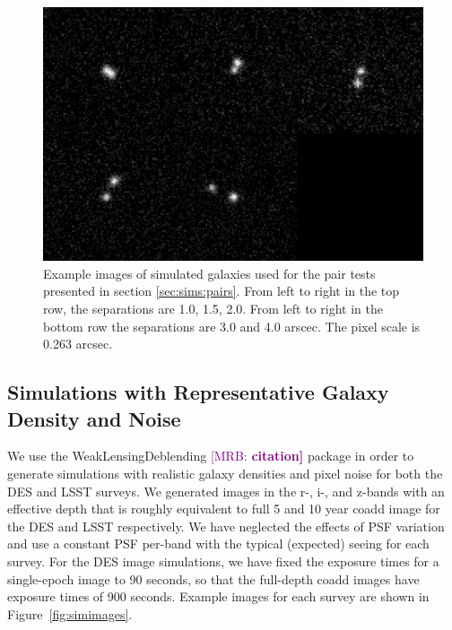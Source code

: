 \documentclass[fleqn,useAMS,usenatbib]{mnras}
\newcommand{\mrb}[1]{\textcolor{purple}{[MRB: \bf #1]}}
\begin{document}
\begin{figure}
    \includegraphics[width=\textwidth]{figures/bdk-comb.png}
    \caption{Example images of simulated galaxies used for the pair tests
    presented in section \ref{sec:sims:pairs}.  From left to right in the top row,
    the separations are 1.0, 1.5, 2.0. From left to right in the bottom row the
    separations are 3.0 and 4.0 arscec. The pixel scale is 0.263 arcsec.
    \label{fig:pairs}}
\end{figure}

\subsection{Simulations with Representative Galaxy Density and Noise}
\label{sec:sims:realgals}

We use the WeakLensingDeblending \mrb{citation} package in order to generate
simulations with realistic galaxy densities and pixel noise for both the
DES and LSST surveys. We generated images in the r-, i-, and z-bands with an
effective depth that is roughly equivalent to full 5 and 10 year coadd image
for the DES and LSST respectively. We have neglected the effects of PSF
variation and use a constant PSF per-band with the typical
(expected) seeing for each survey. For the DES image simulations, we have
fixed the exposure times for a single-epoch image to 90 seconds, so that
the full-depth coadd images have exposure times of 900 seconds. Example images
for each survey are shown in Figure~\ref{fig:simimages}.
\end{document}
